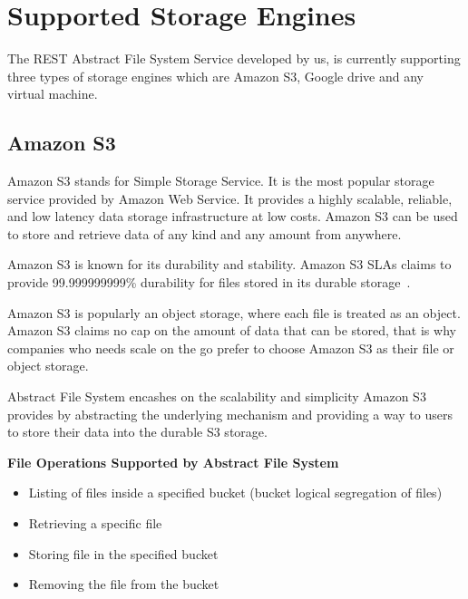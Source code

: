 \section{Supported Storage Engines}

The REST Abstract File System Service developed by us, is currently
supporting three types of storage engines which are Amazon S3, Google
drive and any virtual machine.

\subsection{Amazon S3}

Amazon S3 stands for Simple Storage Service. It is the most popular storage
service provided by Amazon Web Service. It provides a highly scalable,
reliable, and low latency data storage infrastructure at low costs. Amazon S3
can be used to store and retrieve data of any kind and any amount from 
anywhere.


Amazon S3 is known for its durability and stability. Amazon S3 SLAs claims to
provide 99.999999999\% durability for files stored in its durable 
storage~\cite{hid-sp18-420-amazon-S3}.


Amazon S3 is popularly an object storage, where each file is treated as an
object. Amazon S3 claims no cap on the amount of data that can be stored, that
is why companies who needs scale on the go prefer to choose Amazon S3 as their
file or object storage.


Abstract File System encashes on the scalability and simplicity Amazon S3
provides by abstracting the underlying mechanism and providing a way to users
to store their data into the durable S3 storage.


\textbf{File Operations Supported by Abstract File System}


\begin{itemize}
    \item   Listing of files inside a specified bucket (bucket logical
segregation of files)
    \item       Retrieving a specific file
    \item       Storing file in  the specified bucket
    \item       Removing the file from the bucket
\end{itemize}



